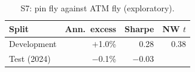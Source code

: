 \documentclass[../main.tex]{subfiles}
\begin{document}
\begin{table}[tbp]
\centering\small
\caption{S7: pin fly against ATM fly (exploratory).}\label{tab:s7}
\begin{tabular}{@{}lrrr@{}}
\toprule
Split & Ann.\ excess & Sharpe & NW $t$ \\
\midrule
Development & $+$1.0\% & 0.28 & 0.38 \\
Test (2024) & $-$0.1\% & $-$0.03 & \\
\bottomrule
\end{tabular}
\end{table}

\end{document}
